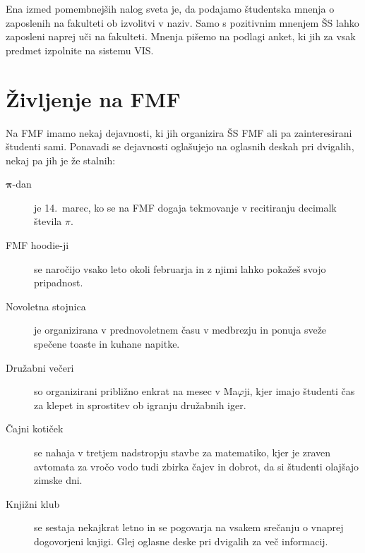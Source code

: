 \documentclass[a4paper,notumble]{leaflet} %
\begin{document}
  Ena izmed pomembnejših nalog sveta je, da podajamo študentska mnenja o zaposlenih na fakulteti
  ob izvolitvi v naziv. Samo s pozitivnim mnenjem ŠS
  lahko zaposleni naprej uči na fakulteti. Mnenja pišemo na podlagi
  anket, ki jih za vsak predmet izpolnite na sistemu VIS.

  \section{Življenje na FMF}
  Na FMF imamo nekaj dejavnosti, ki jih organizira ŠS FMF
  ali pa zainteresirani študenti sami. Ponavadi se dejavnosti oglašujejo
  na oglasnih deskah pri dvigalih, nekaj pa jih je že stalnih:
  \begin{description}
    \item[$\boldsymbol \pi$-dan] je 14.\ marec, ko se na FMF dogaja tekmovanje
    v recitiranju decimalk števila $\pi$.
\item[FMF hoodie-ji] se naročijo vsako leto okoli februarja in z njimi lahko pokažeš svojo pripadnost.
    \item[Novoletna stojnica] je organizirana v prednovoletnem času v medbrezju in ponuja sveže spečene
    toaste in kuhane napitke.
    \item[Družabni večeri] so organizirani približno enkrat na mesec v Ma$\varphi$ji,
    kjer imajo študenti čas za klepet in sprostitev ob igranju družabnih iger.
    \item[Čajni kotiček] se nahaja v tretjem nadstropju stavbe za matematiko, kjer je zraven avtomata za vročo vodo tudi zbirka čajev in dobrot, da si študenti olajšajo zimske dni.
    \item[Knjižni klub] se sestaja nekajkrat letno in se pogovarja na vsakem
    srečanju o vnaprej dogovorjeni knjigi. Glej oglasne deske pri dvigalih za več informacij.
  \end{description}
  \vspace{-1ex}
\end{document}
